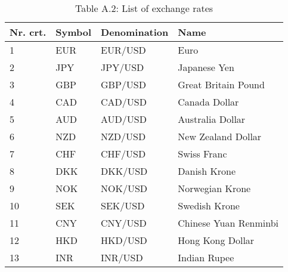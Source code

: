 \begin{table}[H]
\begin{minipage}[b]{0.48\textwidth}
	\end{minipage}
	\hfill
	\begin{minipage}[b]{0.48\textwidth}
		\tiny{	\caption*{Table A.2: List of exchange rates}
			\begin{tabular}{llll} \hline \hline
				Nr. crt. & Symbol & Denomination & Name \\ \hline
				1 & EUR & EUR/USD & Euro \\
				2 & JPY & JPY/USD & Japanese Yen \\
				3 & GBP & GBP/USD & Great Britain Pound \\
				4 & CAD & CAD/USD & Canada Dollar \\
				5 & AUD & AUD/USD & Australia Dollar \\
				6 & NZD & NZD/USD & New Zealand Dollar \\
				7 & CHF & CHF/USD & Swiss Franc \\
				8 & DKK & DKK/USD & Danish Krone \\
				9 & NOK & NOK/USD & Norwegian Krone \\
				10 & SEK & SEK/USD & Swedish Krone \\
				11 & CNY & CNY/USD & Chinese Yuan Renminbi \\
				12 & HKD & HKD/USD & Hong Kong Dollar \\
				13 & INR & INR/USD & Indian Rupee \\ \hline \hline
		\end{tabular}}
	
	\end{minipage}
\end{table}

